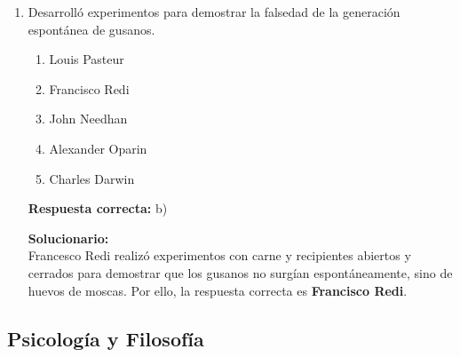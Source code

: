 \begin{enumerate}
	\vspace{2mm}
	\textbf{Solucionario:}\\
	Si los gemelos son del mismo sexo, genéticamente idénticos y muy parecidos físicamente, entonces proceden de un solo cigoto que luego se dividió.  
	Por eso se trata de gemelos \textbf{monocigóticos}.
	
	\vspace{6mm}
	
	\item Desarrolló experimentos para demostrar la falsedad de la generación espontánea de gusanos.
	\begin{enumerate}[label=\alph*)]
		\item Louis Pasteur
		\item Francisco Redi
		\item John Needhan
		\item Alexander Oparin
		\item Charles Darwin
	\end{enumerate}
	\textbf{Respuesta correcta:} b)
	
	\vspace{2mm}
	\textbf{Solucionario:}\\
	Francesco Redi realizó experimentos con carne y recipientes abiertos y cerrados para demostrar que los gusanos no surgían espontáneamente, sino de huevos de moscas.  
	Por ello, la respuesta correcta es \textbf{Francisco Redi}.
	
	\vspace{6mm}
\end{enumerate}

\subsection*{Psicología y Filosofía}

